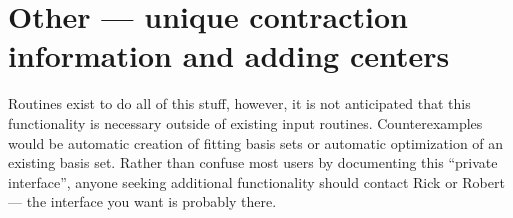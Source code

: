 \section{Other --- unique contraction information and adding
centers}

Routines exist to do all of this stuff, however, it is not anticipated
that this functionality is necessary outside of existing input
routines.  Counterexamples would be automatic creation of fitting
basis sets or automatic optimization of an existing basis set.
Rather than confuse most users by documenting this ``private
interface'', anyone seeking additional functionality should contact
Rick or Robert --- the interface you want is probably there.

